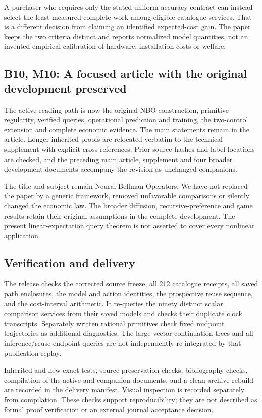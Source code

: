 \documentclass[ecta,nameyear,draft]{econsocart}
\begin{document}
A purchaser who requires only the stated uniform accuracy contract can
instead select the least measured complete work among eligible catalogue
services. That is a different decision from claiming an identified
expected-cost gain. The paper keeps the two criteria distinct and
reports normalized model quantities, not an invented empirical
calibration of hardware, installation costs or welfare.

\hypertarget{b10-m10-a-focused-article-with-the-original-development-preserved}{%
\subsection{B10, M10: A focused article with the original development
preserved}\label{b10-m10-a-focused-article-with-the-original-development-preserved}}

The active reading path is now the original NBO construction, primitive
regularity, verified queries, operational prediction and training, the
two-control extension and complete economic evidence. The main
statements remain in the article. Longer inherited proofs are relocated
verbatim to the technical supplement with explicit cross-references.
Prior source hashes and label locations are checked, and the preceding
main article, supplement and four broader development documents
accompany the revision as unchanged companions.

The title and subject remain Neural Bellman Operators. We have not
replaced the paper by a generic framework, removed unfavorable
comparisons or silently changed the economic law. The broader diffusion,
recursive-preference and game results retain their original assumptions
in the complete development. The present linear-expectation query
theorem is not asserted to cover every nonlinear application.

\hypertarget{verification-and-delivery}{%
\subsection{Verification and delivery}\label{verification-and-delivery}}

The release checks the corrected source freeze, all 212 catalogue
receipts, all saved path enclosures, the model and action identities,
the prospective reuse sequence, and the cost-interval arithmetic. It
re-queries the ninety distinct scalar comparison services from their
saved models and checks their duplicate clock transcripts. Separately
written rational primitives check fixed midpoint trajectories as
additional diagnostics. The large vector continuation trees and all
inference/reuse endpoint queries are not independently re-integrated by
that publication replay.

Inherited and new exact tests, source-preservation checks, bibliography
checks, compilation of the active and companion documents, and a clean
archive rebuild are recorded in the delivery manifest. Visual inspection
is recorded separately from compilation. These checks support
reproducibility; they are not described as formal proof verification or
an external journal acceptance decision.
\end{document}
